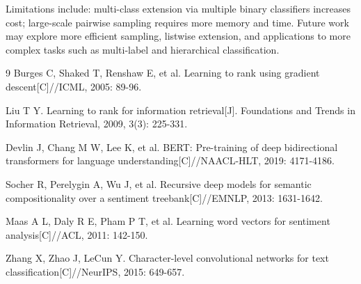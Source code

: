 \documentclass[11pt, a4paper]{article}
\begin{document}
Limitations include: multi-class extension via multiple binary classifiers increases cost; large-scale pairwise sampling requires more memory and time. Future work may explore more efficient sampling, listwise extension, and applications to more complex tasks such as multi-label and hierarchical classification.

\begin{thebibliography}{9}
Burges C, Shaked T, Renshaw E, et al. Learning to rank using gradient descent[C]//ICML, 2005: 89-96.

Liu T Y. Learning to rank for information retrieval[J]. Foundations and Trends in Information Retrieval, 2009, 3(3): 225-331.

Devlin J, Chang M W, Lee K, et al. BERT: Pre-training of deep bidirectional transformers for language understanding[C]//NAACL-HLT, 2019: 4171-4186.

Socher R, Perelygin A, Wu J, et al. Recursive deep models for semantic compositionality over a sentiment treebank[C]//EMNLP, 2013: 1631-1642.

Maas A L, Daly R E, Pham P T, et al. Learning word vectors for sentiment analysis[C]//ACL, 2011: 142-150.

Zhang X, Zhao J, LeCun Y. Character-level convolutional networks for text classification[C]//NeurIPS, 2015: 649-657.
\end{thebibliography}
\end{document}

